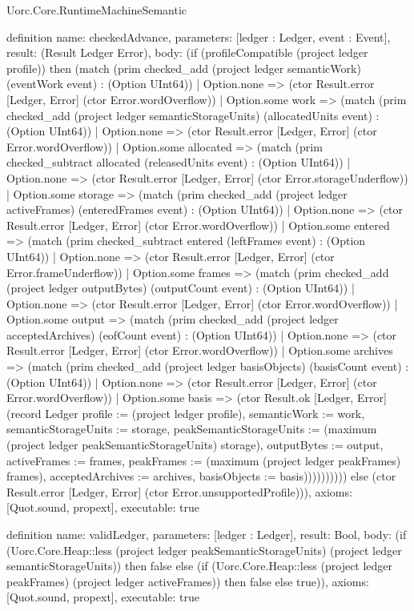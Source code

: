 \begin{lexlean}{Uorc.Core.RuntimeMachineSemantic}
\begin{semanticmodule}
definition{
  name: checkedAdvance,
  parameters: [ledger : Ledger, event : Event],
  result: (Result Ledger Error),
  body: (if (profileCompatible (project ledger profile)) then (match (prim checked_add (project ledger semanticWork) (eventWork event) : (Option UInt64))
    | Option.none => (ctor Result.error [Ledger, Error] (ctor Error.wordOverflow))
    | Option.some work => (match (prim checked_add (project ledger semanticStorageUnits) (allocatedUnits event) : (Option UInt64))
      | Option.none => (ctor Result.error [Ledger, Error] (ctor Error.wordOverflow))
      | Option.some allocated => (match (prim checked_subtract allocated (releasedUnits event) : (Option UInt64))
        | Option.none => (ctor Result.error [Ledger, Error] (ctor Error.storageUnderflow))
        | Option.some storage => (match (prim checked_add (project ledger activeFrames) (enteredFrames event) : (Option UInt64))
          | Option.none => (ctor Result.error [Ledger, Error] (ctor Error.wordOverflow))
          | Option.some entered => (match (prim checked_subtract entered (leftFrames event) : (Option UInt64))
            | Option.none => (ctor Result.error [Ledger, Error] (ctor Error.frameUnderflow))
            | Option.some frames => (match (prim checked_add (project ledger outputBytes) (outputCount event) : (Option UInt64))
              | Option.none => (ctor Result.error [Ledger, Error] (ctor Error.wordOverflow))
              | Option.some output => (match (prim checked_add (project ledger acceptedArchives) (eofCount event) : (Option UInt64))
                | Option.none => (ctor Result.error [Ledger, Error] (ctor Error.wordOverflow))
                | Option.some archives => (match (prim checked_add (project ledger basisObjects) (basisCount event) : (Option UInt64))
                  | Option.none => (ctor Result.error [Ledger, Error] (ctor Error.wordOverflow))
                  | Option.some basis => (ctor Result.ok [Ledger, Error] (record Ledger {profile := (project ledger profile), semanticWork := work, semanticStorageUnits := storage, peakSemanticStorageUnits := (maximum (project ledger peakSemanticStorageUnits) storage), outputBytes := output, activeFrames := frames, peakFrames := (maximum (project ledger peakFrames) frames), acceptedArchives := archives, basisObjects := basis})))))))))) else (ctor Result.error [Ledger, Error] (ctor Error.unsupportedProfile))),
  axioms: [Quot.sound, propext],
  executable: true
}

definition{
  name: validLedger,
  parameters: [ledger : Ledger],
  result: Bool,
  body: (if (Uorc.Core.Heap::less (project ledger peakSemanticStorageUnits) (project ledger semanticStorageUnits)) then false else (if (Uorc.Core.Heap::less (project ledger peakFrames) (project ledger activeFrames)) then false else true)),
  axioms: [Quot.sound, propext],
  executable: true
}


\end{semanticmodule}
\end{lexlean}
